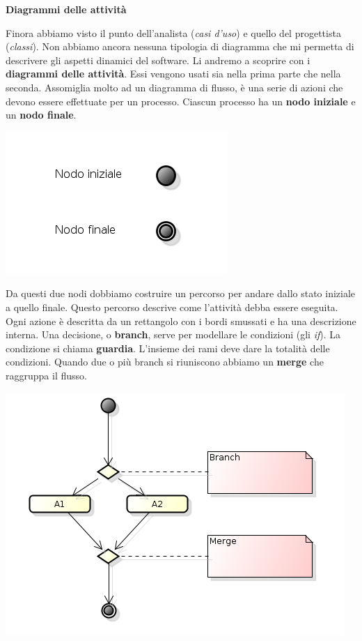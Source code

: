 \textbf{Diagrammi delle attività}

Finora abbiamo visto il punto dell'analista (\textit{casi d'uso}) e quello del progettista (\textit{classi}). Non abbiamo ancora nessuna tipologia di diagramma che mi permetta di descrivere gli aspetti dinamici del software. Li andremo a scoprire con i \textbf{diagrammi delle attività}. Essi vengono usati sia nella prima parte che nella seconda. Assomiglia molto ad un diagramma di flusso, è una serie di azioni che devono essere effettuate per un processo. Ciascun processo ha un \textbf{nodo iniziale} e un \textbf{nodo finale}.

\begin{center}
\includegraphics[width=0.75\columnwidth]{img4} %
\end{center}

Da questi due nodi dobbiamo costruire un percorso per andare dallo stato iniziale a quello finale. Questo percorso descrive come l'attività debba essere eseguita. Ogni azione è descritta da un rettangolo con i bordi smussati e ha una descrizione interna. Una decisione, o \textbf{branch}, serve per modellare le condizioni (gli \textit{if}). La condizione si chiama \textbf{guardia}. L'insieme dei rami deve dare la totalità delle condizioni. Quando due o più branch si riuniscono abbiamo un \textbf{merge} che raggruppa il flusso.

\begin{center}
\includegraphics[width=0.75\columnwidth]{img5} %
\end{center}

